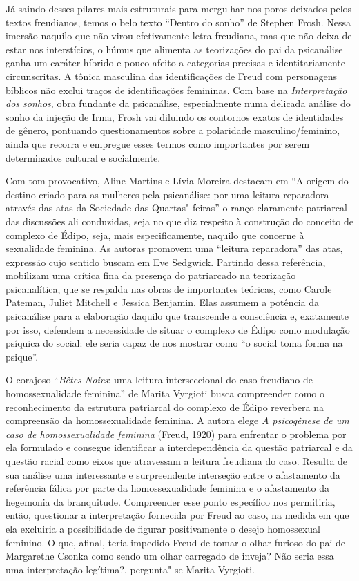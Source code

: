 Já saindo desses pilares mais estruturais para mergulhar nos poros
deixados pelos textos freudianos, temos o belo texto ``Dentro do sonho''
de Stephen Frosh. Nessa imersão naquilo que não virou efetivamente letra
freudiana, mas que não deixa de estar nos interstícios, o húmus que
alimenta as teorizações do pai da psicanálise ganha um caráter híbrido e
pouco afeito a categorias precisas e identitariamente circunscritas. A
tônica masculina das identificações de Freud com personagens bíblicos
não exclui traços de identificações femininas. Com base na
\emph{Interpretação dos sonhos}, obra fundante da psicanálise,
especialmente numa delicada análise do sonho da injeção de Irma, Frosh
vai diluindo os contornos exatos de identidades de gênero, pontuando
questionamentos sobre a polaridade masculino/feminino, ainda que recorra
e empregue esses termos como importantes por serem determinados cultural
e socialmente.

Com tom provocativo, Aline Martins e Lívia Moreira destacam em ``A
origem do destino criado para as mulheres pela psicanálise: por uma
leitura reparadora através das atas da Sociedade das Quartas"-feiras'' o
ranço claramente patriarcal das discussões ali conduzidas, seja no que
diz respeito à construção do conceito de complexo de Édipo, seja, mais
especificamente, naquilo que concerne à sexualidade feminina. As autoras
promovem uma ``leitura reparadora'' das atas, expressão cujo sentido
buscam em Eve Sedgwick. Partindo dessa referência, mobilizam uma crítica
fina da presença do patriarcado na teorização psicanalítica, que se
respalda nas obras de importantes teóricas, como Carole Pateman, Juliet
Mitchell e Jessica Benjamin. Elas assumem a potência da psicanálise para
a elaboração daquilo que transcende a consciência e, exatamente por
isso, defendem a necessidade de situar o complexo de Édipo como
modulação psíquica do social: ele seria capaz de nos mostrar como ``o
social toma forma na psique''.

O corajoso ``\emph{Bêtes Noirs}: uma leitura interseccional do caso
freudiano de homossexualidade feminina'' de Marita Vyrgioti busca
compreender como o reconhecimento da estrutura patriarcal do complexo de
Édipo reverbera na compreensão da homossexualidade feminina. A autora
elege \emph{A psicogênese de um caso de homossexualidade feminina}
(Freud, 1920) para enfrentar o problema por ela formulado e consegue
identificar a interdependência da questão patriarcal e da questão racial
como eixos que atravessam a leitura freudiana do caso. Resulta de sua
análise uma interessante e surpreendente interseção entre o afastamento
da referência fálica por parte da homossexualidade feminina e o
afastamento da hegemonia da branquitude. Compreender esse ponto
específico nos permitiria, então, questionar a interpretação fornecida
por Freud ao caso, na medida em que ela excluiria a possibilidade de
figurar positivamente o desejo homossexual feminino. O que, afinal,
teria impedido Freud de tomar o olhar furioso do pai de Margarethe
Csonka como sendo um olhar carregado de inveja? Não seria essa uma
interpretação legítima?, pergunta"-se Marita Vyrgioti.

